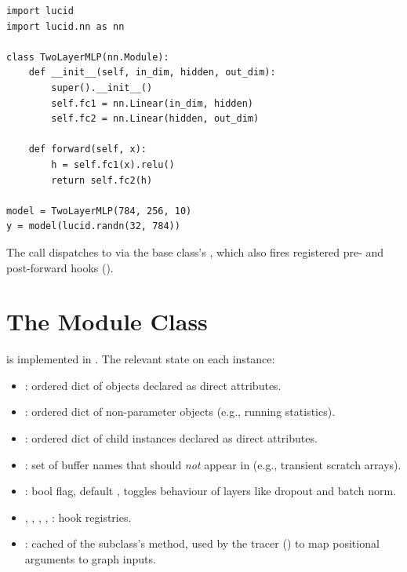\begin{lstlisting}[style=lucid,language=LucidPython]
import lucid
import lucid.nn as nn

class TwoLayerMLP(nn.Module):
    def __init__(self, in_dim, hidden, out_dim):
        super().__init__()
        self.fc1 = nn.Linear(in_dim, hidden)
        self.fc2 = nn.Linear(hidden, out_dim)

    def forward(self, x):
        h = self.fc1(x).relu()
        return self.fc2(h)

model = TwoLayerMLP(784, 256, 10)
y = model(lucid.randn(32, 784))
\end{lstlisting}

The  call dispatches to  via
the base class's , which also fires registered
pre- and post-forward hooks ().

\section{The Module Class}
\label{sec:module_system:module_class}

 is implemented in . The
relevant state on each instance:

\begin{itemize}
  \item {}: ordered dict of  objects
    declared as direct attributes.
  \item {}: ordered dict of non-parameter
     objects (e.g., running statistics).
  \item {}: ordered dict of child 
    instances declared as direct attributes.
  \item {}: set of buffer names
    that should \emph{not} appear in  (e.g.,
    transient scratch arrays).
  \item {}: bool flag, default , toggles
    behaviour of layers like dropout and batch norm.
  \item {}, ,
    ,
    ,
    : hook registries.
  \item {}: cached 
    of the subclass's  method, used by the tracer
    () to map positional arguments to graph
    inputs.
\end{itemize}

